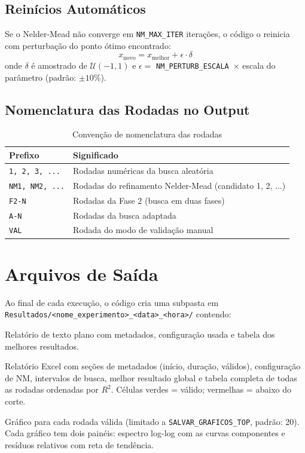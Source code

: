 \documentclass[12pt,a4paper]{report}
\newcommand{\code}[1]{\texttt{#1}}
\begin{document}
\subsection{Reinícios Automáticos}

Se o Nelder-Mead não converge em \code{NM\_MAX\_ITER} iterações, o código
o reinicia com perturbação do ponto ótimo encontrado:
\[
  x_{\text{novo}} = x_{\text{melhor}} + \epsilon \cdot \delta
\]
onde $\delta$ é amostrado de $\mathcal{U}(-1, 1)$ e $\epsilon = $
\code{NM\_PERTURB\_ESCALA}~$ \times$ escala do parâmetro (padrão: $\pm 10\%$).

\subsection{Nomenclatura das Rodadas no Output}

\begin{table}[h!]
  \centering
  \caption{Convenção de nomenclatura das rodadas}
  \begin{tabular}{lp{8cm}}
    \toprule
    \textbf{Prefixo} & \textbf{Significado} \\
    \midrule
    \texttt{1, 2, 3, ...} & Rodadas numéricas da busca aleatória \\
    \texttt{NM1, NM2, ...} & Rodadas do refinamento Nelder-Mead (candidato 1, 2, ...) \\
    \texttt{F2-N} & Rodadas da Fase 2 (busca em duas fases) \\
    \texttt{A-N} & Rodadas da busca adaptada \\
    \texttt{VAL} & Rodada do modo de validação manual \\
    \bottomrule
  \end{tabular}
\end{table}

\section{Arquivos de Saída}

Ao final de cada execução, o código cria uma subpasta em
\texttt{Resultados/<nome\_experimento>\_<data>\_<hora>/} contendo:

\begin{description}[leftmargin=2.5em, style=nextline]
  \item[\texttt{<nome>\_relatorio.txt}]
    Relatório de texto plano com metadados, configuração usada e tabela
    dos melhores resultados.

  \item[\texttt{<nome>\_Relatorio<N>\_<stamp>.xlsx}]
    Relatório Excel com seções de metadados (início, duração, válidos),
    configuração de NM, intervalos de busca, melhor resultado global e
    tabela completa de todas as rodadas ordenadas por $R^2$.
    Células verdes = válido; vermelhas = abaixo do corte.

  \item[\texttt{graficos\_rodadas/rod<NNNN>\_*.png}]
    Gráfico para cada rodada válida (limitado a \code{SALVAR\_GRAFICOS\_TOP},
    padrão: 20). Cada gráfico tem dois painéis: espectro log-log com as
    curvas componentes e resíduos relativos com reta de tendência.
\end{description}
\end{document}
